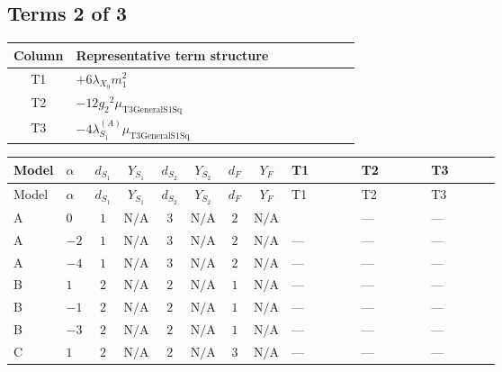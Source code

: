 \documentclass[8pt]{article}
\begin{document}
\begin{landscape}
\subsection*{Terms 2 of 3}
\begin{center}
\begin{tabular}{@{}c >{\raggedright\arraybackslash}p{0.82\linewidth}@{}}
\toprule
Column & Representative term structure \\
\midrule
T1 & \(\displaystyle +6 {\lambda_{X_{9}}} {m_1^2}\) \\
\midrule
T2 & \(\displaystyle -12 {g_2}^2 {\mu_{\mathrm{T3GeneralS1Sq}}}\) \\
\midrule
T3 & \(\displaystyle -4 {\lambda_{S_1}^{(A)}} {\mu_{\mathrm{T3GeneralS1Sq}}}\) \\
\midrule
\bottomrule
\end{tabular}
\end{center}
\smallskip
\tiny
\begin{longtable}{@{}llcccccc >{\raggedright\arraybackslash}p{0.21\linewidth} >{\raggedright\arraybackslash}p{0.21\linewidth} >{\raggedright\arraybackslash}p{0.21\linewidth}@{}}
\toprule
Model & $\alpha$ & $d_{S_1}$ & $Y_{S_1}$ & $d_{S_2}$ & $Y_{S_2}$ & $d_F$ & $Y_F$ & T1 & T2 & T3 \\
\midrule
\endfirsthead
\toprule
Model & $\alpha$ & $d_{S_1}$ & $Y_{S_1}$ & $d_{S_2}$ & $Y_{S_2}$ & $d_F$ & $Y_F$ & T1 & T2 & T3 \\
\midrule
\endhead
A & $0$ & $1$ & $\text{N/A}$ & $3$ & $\text{N/A}$ & $2$ & $\text{N/A}$ & \scriptsize\adjustbox{max width=\linewidth}{$\begin{gathered} +6 {\lambda_{X_{9}}} {m_1^2}\end{gathered}$} & --- & --- \\
\midrule
A & $-2$ & $1$ & $\text{N/A}$ & $3$ & $\text{N/A}$ & $2$ & $\text{N/A}$ & --- & --- & --- \\
\midrule
A & $-4$ & $1$ & $\text{N/A}$ & $3$ & $\text{N/A}$ & $2$ & $\text{N/A}$ & --- & --- & --- \\
\midrule
B & $1$ & $2$ & $\text{N/A}$ & $2$ & $\text{N/A}$ & $1$ & $\text{N/A}$ & --- & --- & --- \\
\midrule
B & $-1$ & $2$ & $\text{N/A}$ & $2$ & $\text{N/A}$ & $1$ & $\text{N/A}$ & --- & --- & --- \\
\midrule
B & $-3$ & $2$ & $\text{N/A}$ & $2$ & $\text{N/A}$ & $1$ & $\text{N/A}$ & --- & --- & --- \\
\midrule
C & $1$ & $2$ & $\text{N/A}$ & $2$ & $\text{N/A}$ & $3$ & $\text{N/A}$ & --- & --- & --- \\

\end{longtable}
\end{landscape}
\end{document}
